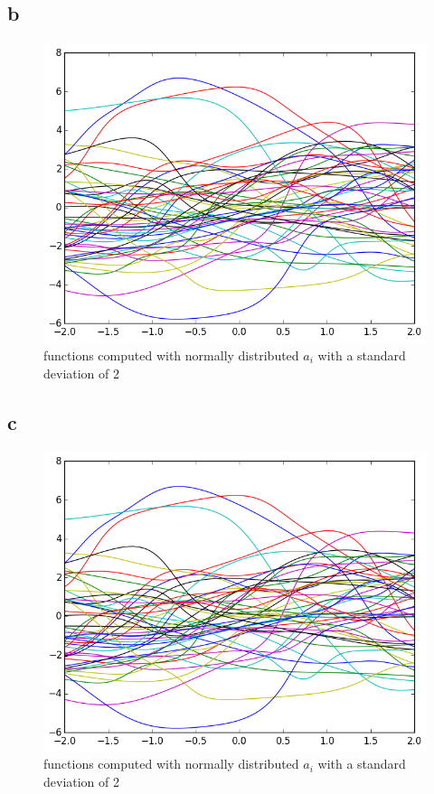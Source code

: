 \documentclass[11pt,a4paper]{article}
\begin{document}
\subsection*{b}
\begin{figure}[h]
\centering
 \includegraphics[width=\textwidth]{./2_3_std=2.png}
\caption{functions computed with normally distributed $a_i$ with a standard deviation of 2}
\end{figure}
\newpage
\subsection*{c}
\begin{figure}[h]
\centering
 \includegraphics[width=\textwidth]{./2_3_std=2.png}
\caption{functions computed with normally distributed $a_i$ with a standard deviation of 2}
\end{figure}
\end{document}
